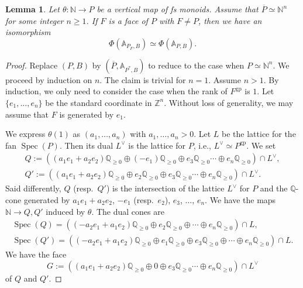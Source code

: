 \documentclass[10pt]{amsart}
\newtheorem{lem}[thm]{Lemma}
\theoremstyle{definition}
\theoremstyle{remark}
\numberwithin{equation}{subsection}
\newcommand{\A}{\mathbb{A}}
\newcommand{\N}{\mathbb{N}}
\newcommand{\Q}{\mathbb{Q}}
\newcommand{\Z}{\mathbb{Z}}
\DeclareMathOperator{\Spec}{Spec}
\newcommand{\ol}{\overline}
\newcommand{\gp}{\mathrm{gp}}
\begin{document}
\begin{lem}
\label{lemma.17}
Let $\theta\colon \N\to P$ be a vertical map of fs monoids.
Assume that $\ol{P}\simeq \N^n$ for some  integer $n\geq 1$.
If $F$ is a face of $P$ with $F\neq P$, then we have an isomorphism
\[
\Phi(\A_{P_F,B})
\simeq
\Phi(\A_{P,B}).
\]
\end{lem}
\begin{proof}
Replace $(P,B)$ by $(\ol{P},\A_{P^*,B})$ to reduce to the case when $P\simeq \N^n$.
We proceed by induction on $n$.
The claim is trivial for $n=1$.
Assume $n>1$.
By induction, we only need to consider the case when the rank of $F^\gp$ is $1$.
Let $\{e_1,\ldots,e_n\}$ be the standard coordinate in $\Z^n$.
Without loss of generality, we may assume that $F$ is generated by $e_1$.


We express $\theta(1)$ as $(a_1,\ldots,a_n)$ with $a_1,\ldots,a_n >0$.
Let $L$ be the lattice for the fan $\Spec(P)$.
Then its dual $L^\vee$ is the lattice for $P$,
i.e., $L^\vee\simeq P^\gp$.
We set
\begin{gather*}
Q:=((a_1e_1+a_2e_2)\Q_{\geq 0}\oplus (-e_1)\Q_{\geq 0} \oplus e_3\Q_{\geq 0}\cdots \oplus e_n \Q_{\geq 0})\cap L^\vee,
\\
Q':=((a_1e_1+a_2e_2)\Q_{\geq 0}\oplus e_2\Q_{\geq 0}\oplus e_3\Q_{\geq 0}\cdots \oplus e_n \Q_{\geq 0})\cap L^\vee.
\end{gather*}
Said differently,
$Q$ (resp.\ $Q'$) is the intersection of the lattice $L^\vee$ for $P$ and the $\Q$-cone \cite[Definition I.2.3.1]{Ogu} generated by $a_1e_1+a_2e_2$, $-e_1$ (resp.\ $e_2$), $e_3$, $\ldots$, $e_n$.
We have the maps $\N\to Q,Q'$ induced by $\theta$.
The dual cones are
\begin{gather*}
\Spec(Q)=((-a_2e_1+a_1e_2)\Q_{\geq 0} \oplus e_2 \Q_{\geq 0} \oplus \cdots \oplus e_n \Q_{\geq 0})\cap L,
\\
\Spec(Q')=((-a_2e_1+a_1e_2)\Q_{\geq 0} \oplus e_1 \Q_{\geq 0}\oplus e_3\Q_{\geq 0}\oplus \cdots \oplus e_n \Q_{\geq 0})\cap L.
\end{gather*}
We have the face
\[
G:=((a_1e_1+a_2e_2)\Q_{\geq 0}\oplus 0\oplus e_3\Q_{\geq 0}\cdots \oplus e_n \Q_{\geq 0})\cap L^\vee\]
of $Q$ and $Q'$.





\end{proof}
\end{document}
